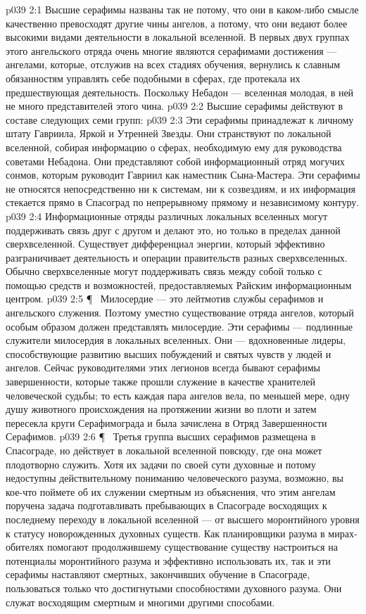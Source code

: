 \vs p039 2:1 Высшие серафимы названы так не потому, что они в каком\hyp{}либо смысле качественно превосходят другие чины ангелов, а потому, что они ведают более высокими видами деятельности в локальной вселенной. В первых двух группах этого ангельского отряда очень многие являются серафимами достижения --- ангелами, которые, отслужив на всех стадиях обучения, вернулись к славным обязанностям управлять себе подобными в сферах, где протекала их предшествующая деятельность. Поскольку Небадон --- вселенная молодая, в ней не много представителей этого чина.
\vs p039 2:2 Высшие серафимы действуют в составе следующих семи групп:
\vs p039 2:3 \bibnobreakspace {} Эти серафимы принадлежат к личному штату Гавриила, Яркой и Утренней Звезды. Они странствуют по локальной вселенной, собирая информацию о сферах, необходимую ему для руководства советами Небадона. Они представляют собой информационный отряд могучих сонмов, которым руководит Гавриил как наместник Сына\hyp{}Мастера. Эти серафимы не относятся непосредственно ни к системам, ни к созвездиям, и их информация стекается прямо в Спасоград по непрерывному прямому и независимому контуру.
\vs p039 2:4 Информационные отряды различных локальных вселенных могут поддерживать связь друг с другом и делают это, но только в пределах данной сверхвселенной. Существует дифференциал энергии, который эффективно разграничивает деятельность и операции правительств разных сверхвселенных. Обычно сверхвселенные могут поддерживать связь между собой только с помощью средств и возможностей, предоставляемых Райским информационным центром.
\vs p039 2:5 \P\ \bibnobreakspace {} Милосердие --- это лейтмотив службы серафимов и ангельского служения. Поэтому уместно существование отряда ангелов, который особым образом должен представлять милосердие. Эти серафимы --- подлинные служители милосердия в локальных вселенных. Они --- вдохновенные лидеры, способствующие развитию высших побуждений и святых чувств у людей и ангелов. Сейчас руководителями этих легионов всегда бывают серафимы завершенности, которые также прошли служение в качестве хранителей человеческой судьбы; то есть каждая пара ангелов вела, по меньшей мере, одну душу животного происхождения на протяжении жизни во плоти и затем пересекла круги Серафимограда и была зачислена в Отряд Завершенности Серафимов.
\vs p039 2:6 \P\ \bibnobreakspace {} Третья группа высших серафимов размещена в Спасограде, но действует в локальной вселенной повсюду, где она может плодотворно служить. Хотя их задачи по своей сути духовные и потому недоступны действительному пониманию человеческого разума, возможно, вы кое\hyp{}что поймете об их служении смертным из объяснения, что этим ангелам поручена задача подготавливать пребывающих в Спасограде восходящих к последнему переходу в локальной вселенной --- от высшего моронтийного уровня к статусу новорожденных духовных существ. Как планировщики разума в мирах\hyp{}обителях помогают продолжившему существование существу настроиться на потенциалы моронтийного разума и эффективно использовать их, так и эти серафимы наставляют смертных, закончивших обучение в Спасограде, пользоваться только что достигнутыми способностями духовного разума. Они служат восходящим смертным и многими другими способами.
